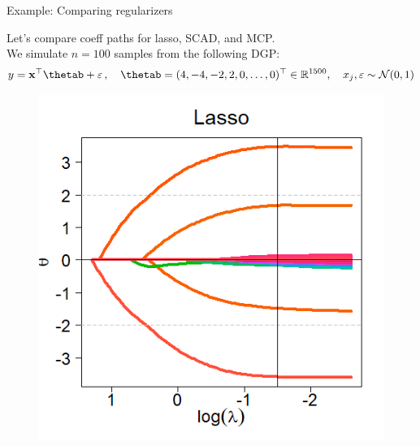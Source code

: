 \documentclass[11pt,compress,t,notes=noshow, xcolor=table]{beamer}
\begin{document}
\begin{vbframe}{Example: Comparing regularizers}

Let's compare coeff paths for lasso, SCAD, and MCP.\\
\vspace{0.15cm}
We simulate $n=100$ samples from the following DGP:
{\small
$$y = \xv^{\top} \thetab + \varepsilon\,,\quad \thetab =(4,-4,-2,2,0,\ldots,0)^{\top} \in \mathbb{R}^{1500}, \quad x_j,\varepsilon \sim \mathcal{N}(0,1)$$
}
\vspace{-1cm}

  \begin{figure}[h]
    \begin{minipage}{0.32\linewidth}
      \vspace{3pt}
      \centerline{\includegraphics[width=\textwidth]{figure_man/other-pen-lasso.png}}
    \end{minipage}
    \begin{minipage}{0.32\linewidth}
      \vspace{3pt}

\end{minipage}
\end{figure}
\end{vbframe}
\end{document}
